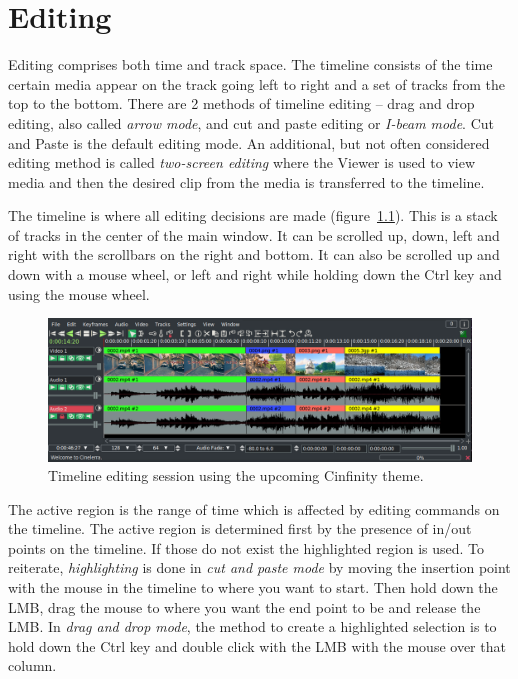 \chapter{Editing}%
\label{cha:editing}

Editing comprises both time and track space.  The timeline consists of the time certain media appear on the track going left to right and a set of tracks from the top to the bottom.  There are 2 methods of timeline editing -- drag and drop editing, also called \textit{arrow mode}, and cut and paste editing or \textit{I-beam mode}.  Cut and Paste is the default editing mode.  An additional, but not often considered editing method is called \textit{two-screen editing} where the Viewer is used to view media and then the desired clip from the media is transferred to the timeline.

The timeline is where all editing decisions are made (figure~\ref{fig:timeline}).  This is a stack of tracks in the center of the main window.  It can be scrolled up, down, left and right with the scrollbars on the right and bottom.  It can also be scrolled up and down with a mouse wheel, or left and right while holding down the Ctrl key and using the mouse wheel.

\begin{figure}[htpb]
    \centering
    \includegraphics[width=0.8\linewidth]{images/timeline.png}
    \caption{Timeline editing session using the upcoming Cinfinity theme.}
    \label{fig:timeline}
\end{figure}

The active region is the range of time which is affected by editing commands on the 
timeline.  The active region is determined first by the presence of in/out points on the 
timeline.  
If those do not exist the highlighted region is used. To reiterate, \emph{highlighting}
is done in \emph{cut and paste mode} by moving the insertion point with the mouse in the timeline
to where you want to start. Then hold down the LMB, drag the mouse to where you want
the end point to be and release the LMB. In \emph{drag and drop mode}, the method to create a highlighted
selection is to hold down the Ctrl key and double click with the LMB with the mouse over that column.

